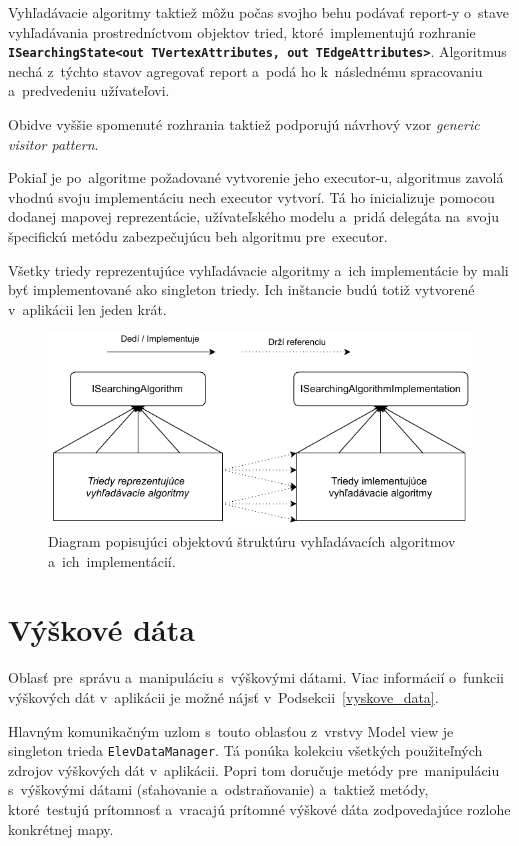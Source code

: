Vyhľadávacie algoritmy taktiež môžu počas svojho behu podávať report-y o~stave vyhľadávania prostredníctvom objektov tried, ktoré~implementujú rozhranie \textbf{\texttt{ISearchingState<out TVertexAttributes, out TEdgeAttributes>}}. Algoritmus nechá z~týchto stavov agregovať report a~podá ho k~následnému spracovaniu a~predvedeniu užívateľovi.

Obidve vyššie spomenuté rozhrania taktiež podporujú návrhový vzor \textit{generic visitor pattern}. 

Pokiaľ je po~algoritme požadované vytvorenie jeho executor-u, algoritmus zavolá vhodnú svoju implementáciu nech executor vytvorí. Tá ho inicializuje pomocou dodanej mapovej reprezentácie, užívateľského modelu a~pridá delegáta na~svoju špecifickú metódu zabezpečujúcu beh algoritmu pre~executor.

Všetky triedy reprezentujúce vyhľadávacie algoritmy a~ich implementácie by mali byť implementované ako singleton triedy. Ich inštancie budú totiž vytvorené v~aplikácii len jeden krát.


\begin{figure}[h]\centering
\includegraphics[]{img/vyhladavacie_algoritmy_architektura}
\caption{Diagram popisujúci objektovú štruktúru vyhľadávacích algoritmov a~ich~implementácií.} 
\label{obr09:vyhladavacie_algoritmy_architektura}
\end{figure}

\pagebreak

\section{Výškové dáta}

Oblasť pre~správu a~manipuláciu s~výškovými dátami. Viac informácií o~funkcii výškových dát v~aplikácii je možné nájsť v~Podsekcii~\ref{vyskove_data}. 

Hlavným komunikačným uzlom s~touto oblasťou z~vrstvy Model view je singleton trieda \texttt{ElevDataManager}. Tá ponúka kolekciu všetkých použiteľných zdrojov výškových dát v~aplikácii. Popri tom doručuje metódy pre~manipuláciu s~výškovými dátami (sťahovanie a~odstraňovanie) a~taktiež metódy, ktoré~testujú prítomnosť a~vracajú prítomné výškové dáta zodpovedajúce rozlohe konkrétnej mapy.

